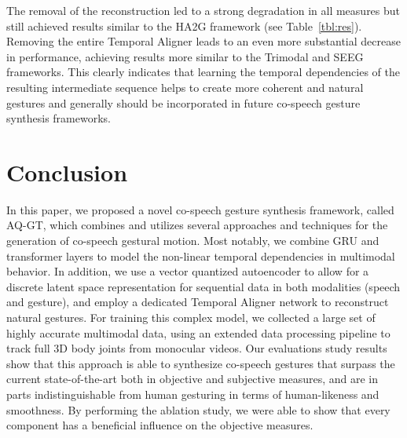 \documentclass[sigconf]{acmart}
\begin{document}
The removal of the  reconstruction led to a strong degradation in all measures but still achieved results similar to the HA2G framework (see Table~\ref{tbl:res}). Removing the entire Temporal Aligner leads to an even more substantial decrease in performance, achieving results more similar to the Trimodal and SEEG frameworks. This clearly indicates that learning the temporal dependencies of the resulting intermediate sequence helps to create more coherent and natural gestures and generally should be incorporated in future co-speech gesture synthesis frameworks.



\section{Conclusion}
In this paper, we proposed a novel co-speech gesture synthesis framework, called  AQ-GT, which combines and utilizes several approaches and techniques for the generation of co-speech gestural motion. Most notably, we combine GRU and transformer layers to model the non-linear temporal dependencies in multimodal behavior. In addition, we use a vector quantized autoencoder to allow for a discrete latent space representation for sequential data in both modalities (speech and gesture), and employ a dedicated Temporal Aligner network to reconstruct natural gestures. For training this complex model, we collected a large set of highly accurate multimodal data, using an extended data processing pipeline to track full 3D body joints from monocular videos. Our evaluations study results show that this approach is able to synthesize co-speech gestures that surpass the current state-of-the-art both in objective and subjective measures, and are in parts indistinguishable from human gesturing in terms of human-likeness and smoothness. By performing the ablation study, we were able to 
show that every component has a beneficial influence on the objective measures.
\end{document}
